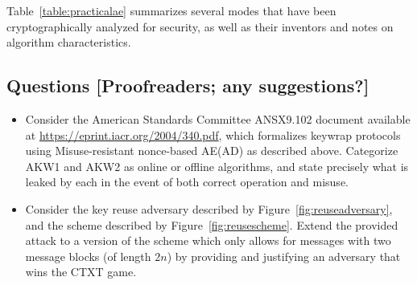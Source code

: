 Table~\ref{table:practicalae} summarizes several modes that have been cryptographically analyzed for security, as well as their inventors and notes on 
algorithm characteristics.

\subsection{Questions [Proofreaders; any suggestions?]}

\begin{itemize}
\item Consider the American Standards Committee ANSX9.102 document available at \url{https://eprint.iacr.org/2004/340.pdf}, which formalizes keywrap protocols using Misuse-resistant nonce-based AE(AD) as described above.  Categorize AKW1 and AKW2 as online or offline algorithms, and state precisely what is leaked by each in the event of both correct operation and misuse.
\item Consider the key reuse adversary described by Figure~\ref{fig:reuseadversary}, and the scheme described by Figure~\ref{fig:reusescheme}.  Extend the provided attack to a version of the scheme which only allows for messages with two message blocks (of length $2n$) by providing and justifying an adversary that wins the CTXT game.
\end{itemize}
